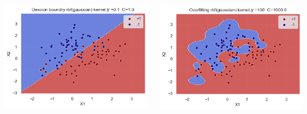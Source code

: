 \documentclass[12pt,t]{beamer}
\begin{document}
\begin{frame}[t]
    \begin{columns}
        \begin{column}[]{0.5\linewidth}
            \includegraphics[width=\linewidth]{images/p1a/1/d3.png}
        \end{column}
        \begin{column}[]{0.5\linewidth}
            \includegraphics[width=\linewidth]{images/p1a/1/overfit1.png}
        \end{column}
        
    \end{columns}
\end{frame}
\end{document}
